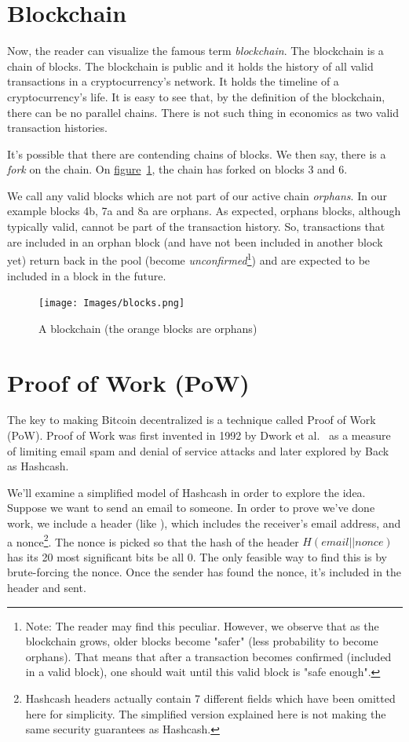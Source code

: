 \section{\label{sec:blockchain}Blockchain}
Now, the reader can visualize the famous term \emph{blockchain}. The blockchain is a chain of blocks. The blockchain is public and it holds the history of all valid transactions in a cryptocurrency's network. It holds the timeline of a cryptocurrency's life. It is easy to see that, by the definition of the blockchain, there can be no parallel chains. There is not such thing in economics as two valid transaction histories.

It's possible that there are contending chains of blocks. We then say, there is a \emph{fork} on the chain. On \hyperref[fig:blocks]{figure}~\ref{fig:blocks}, the chain has forked on blocks 3 and 6.

We call any valid blocks which are not part of our active chain \emph{orphans}. In our example blocks 4b, 7a and 8a are orphans. As expected, orphans blocks, although typically valid, cannot be part of the transaction history. So, transactions that are included in an orphan block (and have not been included in another block yet) return back in the pool (become \emph{unconfirmed}\footnote{Note: The reader may find this peculiar. However, we observe that as the blockchain grows, older blocks become "safer" (less probability to become orphans). That means that after a transaction becomes confirmed (included in a valid block), one should wait until this valid block is "safe enough".}) and are expected to be included in a block in the future.
\begin{figure}[H]
  \centering
  \texttt{[image: Images/blocks.png]}
  \caption{A blockchain (the orange blocks are orphans)~\cite{mastering}}
  \label{fig:blocks}
\end{figure}

\section{Proof of Work (PoW)} \label{sec:proofofwork}
The key to making Bitcoin decentralized is a technique called Proof of Work (PoW). Proof of Work was first invented in 1992 by Dwork et al.~\cite{dwork} as a measure of limiting email spam and denial of service attacks and later explored by Back~\cite{hashcash} as Hashcash.

We'll examine a simplified model of Hashcash in order to explore the idea. Suppose we want to send an email to someone. In order to prove we've done work, we include a header (like ), which includes the receiver's email address, and a nonce\footnote{Hashcash headers actually contain 7 different fields which have been omitted here for simplicity. The simplified version explained here is not making the same security guarantees as Hashcash.}. The nonce is picked so that the hash of the header $H(email || nonce)$ has its 20 most significant bits be all 0. The only feasible way to find this is by brute-forcing the nonce. Once the sender has found the nonce, it's included in the header and sent.

